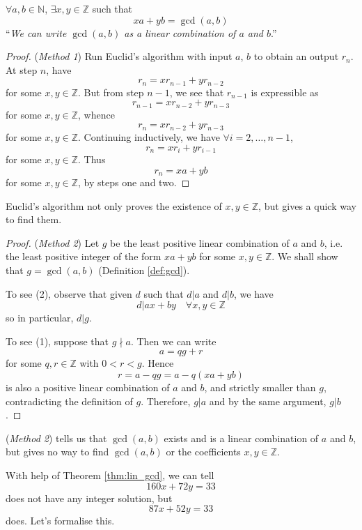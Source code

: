 \documentclass[10pt, a4paper, twoside]{report}
\begin{document}
\begin{theorem}
    \(\forall a,b\in\mathbb{N}\), \(\exists x,y\in\mathbb{Z}\) such that
    \[xa+yb=\gcd(a,b)\]
    ``\emph{We can write \(\gcd(a,b)\) as a linear combination of \(a\) and \(b\)}.''
    \label{thm:lin_gcd}
\end{theorem}
\begin{proof}
    (\emph{Method 1}) Run Euclid's algorithm with input \(a\), \(b\) to obtain an output \(r_n\). At step \(n\), have 
    \[r_n=xr_{n-1}+yr_{n-2}\]
    for some \(x,y\in\mathbb{Z}\). But from step \(n-1\), we see that \(r_{n-1}\) is expressible as 
    \[r_{n-1}=xr_{n-2}+yr_{n-3}\] 
    for some \(x,y\in\mathbb{Z}\), whence 
    \[r_{n}=xr_{n-2}+yr_{n-3}\] 
    for some \(x,y\in\mathbb{Z}\). Continuing inductively, we have \(\forall i=2,\ldots,n-1\),
    \[r_n=xr_i+yr_{i-1}\]
    for some \(x,y\in\mathbb{Z}\). Thus
    \[r_n=xa+yb\]
    for some \(x,y\in\mathbb{Z}\), by steps one and two.
\end{proof}
\begin{remark}
    Euclid's algorithm not only proves the existence of \(x,y\in\mathbb{Z}\), but gives a quick way to find them.
\end{remark}
\begin{proof}
    (\emph{Method 2}) Let \(g\) be the least positive linear combination of \(a\) and \(b\), i.e. the least positive integer of the form \(xa+yb\) for some \(x,y\in\mathbb{Z}\). We shall show that \(g=\gcd(a,b)\) (Definition \ref{def:gcd}).

    To see (2), observe that given \(d\) such that \(d|a\) and \(d|b\), we have
    \[d|ax+by\quad\forall x,y\in\mathbb{Z}\]
    so in particular, \(d|g\).

    To see (1), suppose that \(g\nmid a\). Then we can write
    \[a=qg+r\] for some \(q,r\in\mathbb{Z}\) with \(0<r<g\). Hence
    \[r=a-qg=a-q(xa+yb)\]
    is also a positive linear combination of \(a\) and \(b\), and strictly smaller than \(g\), contradicting the definition of \(g\). Therefore, \(g|a\) and by the same argument, \(g|b\).
\end{proof}
\begin{remark}
    (\emph{Method 2}) tells us that \(\gcd(a,b)\) exists and is a linear combination of \(a\) and \(b\), but gives no way to find \(\gcd(a,b)\) or the coefficients \(x,y\in\mathbb{Z}\).
\end{remark}
With help of Theorem \ref{thm:lin_gcd}, we can tell
\[160x+72y=33\]
does not have any integer solution, but
\[87x+52y=33\]
does. Let's formalise this.
\end{document}
